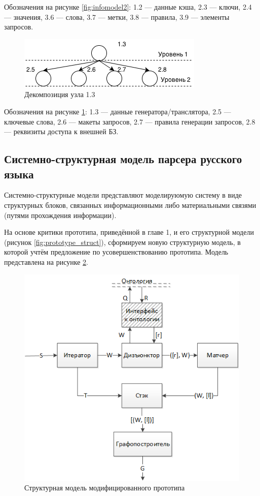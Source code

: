 Обозначения на рисунке \ref{fig:infomodel2}: 1.2 --- данные кэша, 2.3 --- ключи, 2.4 --- значения, 3.6 --- слова, 3.7 --- метки, 3.8 --- правила, 3.9 --- элементы запросов.

\begin{figure}[H]
	\centering
		\includegraphics[scale=1.0]{images/infomodel3.png}
	\caption{\small Декомпозиция узла 1.3}
	\label{fig:infomodel3}
\end{figure}

Обозначения на рисунке \ref{fig:infomodel3}: 1.3 --- данные генератора/транслятора, 2.5 --- ключевые слова, 2.6 --- макеты запросов, 2.7 --- правила генерации запросов, 2.8 --- реквизиты доступа к внешней БЗ.

\subsection{Системно-структурная модель парсера русского языка}

Системно-структурные модели представляют моделируюмую систему в виде структурных блоков, связанных информационными либо материальными связями (путями прохождения информации).

На основе критики прототипа, приведённой в главе 1, и его структурной модели (рисунок \ref{fig:prototype_struct}), сформируем новую структурную модель, в которой учтём предложение по усовершенствованию прототипа. Модель представлена на рисунке \ref{fig:modifiedstruct}.

\begin{figure}[H]
	\centering
		\includegraphics[scale=1.0]{images/modifiedstructure.png}
	\caption{\small Структурная модель модифицированного прототипа}
	\label{fig:modifiedstruct}
\end{figure}

